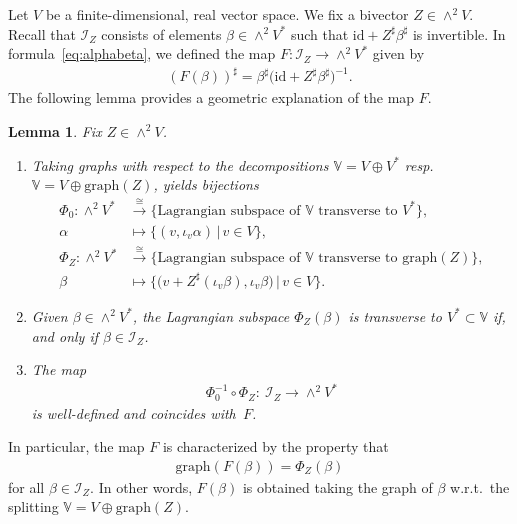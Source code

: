 \documentclass[10pt,a4paper]{amsart}
\numberwithin{equation}{section}
\newtheorem{Lemma}[Theorem]{Lemma}
\newcommand{\id}{\mathrm{id}}
\newcommand{\V}{\mathbb{V}}
\begin{document}
Let $V$ be a finite-dimensional, real vector space. We fix a bivector $Z\in \wedge^2V$. Recall that $\mathcal{I}_Z$ consists of elements $\beta\in \wedge^2 V^*$ such that $\mathrm{id} + Z^\sharp \beta^\sharp $ is invertible. In formula~\eqref{eq:alphabeta}, we defined the map $F \colon \mathcal{I}_Z\to \wedge^2 V^*$ given by
\begin{gather*}
(F (\beta))^\sharp = \beta^\sharp\big(\id + Z^{\sharp}\beta^\sharp\big)^{-1}.\end{gather*}
The following lemma provides a geometric explanation of the map $F$.

\begin{Lemma}\label{lemma: almost Dirac structures} Fix $Z\in \wedge^2V$.\samepage
\begin{enumerate}\itemsep=0pt
\item[$(i)$] Taking graphs with respect to the decompositions $\V=V\oplus V^*$ resp.~$\V=V\oplus \mathrm{graph}(Z)$, yields bijections
\begin{align*}
 \Phi_0\colon \wedge^2 V^* &\stackrel{\cong}{\longrightarrow} \{\textrm{Lagrangian subspace of $\V$ transverse to } V^*\},\\
 {\alpha} & \mapsto \{(v,\iota_v{\alpha})\,|\,v\in V\},\\
 \Phi_Z\colon \wedge^2 V^* &\stackrel{\cong}{\longrightarrow} \{\textrm{Lagrangian subspace of $\V$ transverse to } {\mathrm{graph}(Z)}\},\\
 \beta &\mapsto \big\{\big(v+Z^\sharp(\iota_v\beta),\iota_v\beta\big)\,|\,v\in V\big\}.
\end{align*}
\item[$(ii)$] Given $\beta \in \wedge^2 V^*$, the Lagrangian subspace $\Phi_Z(\beta)$ is transverse to $V^*\subset \V$ if, and only if {$\beta\in \mathcal{I}_Z$}.
\item[$(iii)$]
The map \begin{gather*}\Phi_0^{-1}\circ \Phi_Z\colon \ \mathcal{I}_Z\to \wedge^2 V^*\end{gather*} is well-defined and coincides with~$F$.
\end{enumerate}
\end{Lemma}
In particular, the map $F$ is characterized by the property that
\begin{gather}\label{eq:phizbeta}
\mathrm{graph}(F(\beta))=\Phi_Z(\beta)
\end{gather}
 for all $\beta\in \mathcal{I}_Z$. In other words, $F(\beta)$ is obtained taking the graph of $\beta$ w.r.t.\ the splitting $\V=V\oplus \mathrm{graph}(Z)$.
\end{document}
